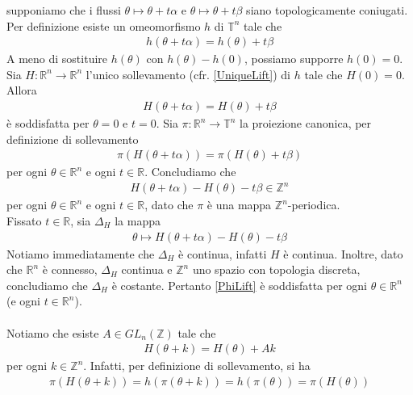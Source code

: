 \documentclass[twoside, 11pt]{amsbook}
\makeatletter
\newcommand{\0}{{(0)}}
\newcommand{\3}{{(3)}}
\theoremstyle{colonplain}
\theoremstyle{colondefinition}
\theoremstyle{colonremark}
\numberwithin{equation}{chapter}
\renewcommand{\proofname}{Dimostrazione}
\renewenvironment{proof}[1][\proofname]{\par
  \pushQED{\qed}%
  \normalfont \topsep6\p@\@plus6\p@\relax
  \trivlist
  \item[\hskip\labelsep\bfseries #1:]\ignorespaces
}{%
  \popQED\endtrivlist\@endpefalse
}
\makeatother
\begin{document}
\begin{proof} supponiamo che i flussi $\theta \mapsto \theta + t\alpha$ e $\theta \mapsto \theta + t\beta$ siano topologicamente coniugati. Per definizione esiste un omeomorfismo $h$ di $\mathbb{T}^n$ tale che 
\begin{align}
    h(\theta + t\alpha) = h(\theta) + t\beta 
\end{align}
A meno di sostituire $h(\theta)$ con $h(\theta) - h(0)$, possiamo supporre $h(0) = 0$. Sia $H : \mathbb{R}^n \longrightarrow \mathbb{R}^n$ l'unico sollevamento (cfr. \cref{UniqueLift}) di $h$ tale che $H(0) = 0$. Allora 
\begin{align}\label{PhiLift}
    H(\theta + t\alpha) = H(\theta) + t\beta 
\end{align}
è soddisfatta per $\theta = 0$ e $t = 0$. Sia $\pi : \mathbb{R}^n \longrightarrow \mathbb{T}^n$ la proiezione canonica, per definizione di sollevamento
\begin{align}
    \pi(H(\theta + t\alpha)) = \pi(H(\theta) + t\beta) 
\end{align}
 per ogni $\theta \in \mathbb{R}^n$ e ogni $t \in \mathbb{R}$. Concludiamo che 
\begin{align}
    H(\theta + t\alpha) - H(\theta) - t\beta \in \mathbb{Z}^n 
\end{align}
per ogni $\theta \in \mathbb{R}^n$ e ogni $t \in \mathbb{R}$, dato che $\pi$ è una mappa $\mathbb{Z}^n$-periodica. \\
Fissato $t \in \mathbb{R}$, sia $\Delta_H$ la mappa
\begin{align}
    \theta \mapsto H(\theta + t\alpha) - H(\theta) - t\beta 
\end{align}
Notiamo immediatamente che $\Delta_H$ è continua, infatti $H$ è continua. Inoltre, dato che $\mathbb{R}^n$ è connesso, $\Delta_H$ continua e $\mathbb{Z}^n$ uno spazio con topologia discreta, concludiamo che $\Delta_H$ è costante. Pertanto \eqref{PhiLift} è soddisfatta per ogni $\theta \in \mathbb{R}^n$ (e ogni $t \in \mathbb{R}^n$). \\ \\
Notiamo che esiste $A \in GL_n(\mathbb{Z})$ tale che
 \begin{align}
    H(\theta + k) = H(\theta) + Ak 
 \end{align}
per ogni $k \in \mathbb{Z}^n$. Infatti, per definizione di sollevamento, si ha
\begin{align}
    \pi(H(\theta + k)) = h(\pi(\theta + k)) = h(\pi(\theta)) = \pi(H(\theta))
 \end{align}

\end{proof}
\end{document}
